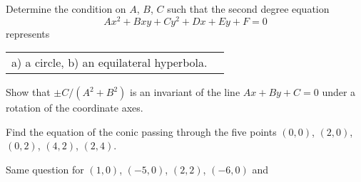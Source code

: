 \documentclass{book}
\begin{document}
\begin{exercise}
Determine the condition on $A$, $B$, $C$ such that the second degree equation
$$
Ax^2 + Bxy + Cy^2 + Dx + Ey + F = 0
$$
represents
\begin{center}
\begin{tabular}{ll}
a) a circle,\quad \quad 
b) an equilateral hyperbola.
\end{tabular}
\end{center}
\end{exercise}

\begin{exercise}
Show that $ \pm C / (A^2 + B^2) $ is an invariant of the line $ Ax + By + C = 0 $ under a rotation of the coordinate axes.
\end{exercise}
\begin{exercise}
Find the equation of the conic passing through the five points $(0,0)$, $(2,0)$, $(0,2)$, $(4,2)$, $(2,4)$.
\end{exercise}
\begin{exercise}
Same question for $(1,0)$, $(-5,0)$, $(2,2)$, $(-6,0)$ and

\end{exercise}
\end{document}
